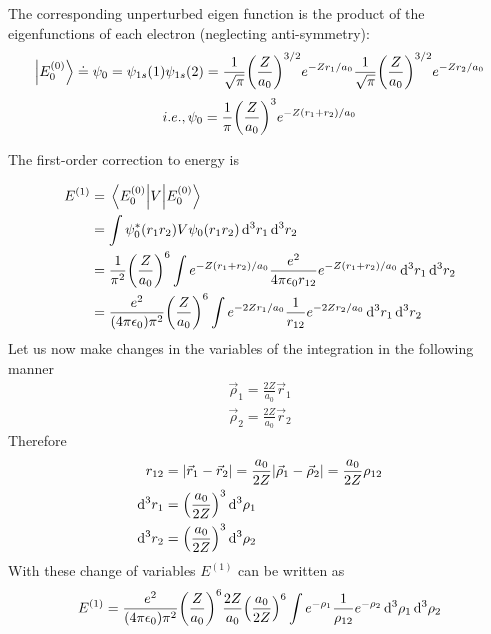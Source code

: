 \begin{enumerate}[label=Problem.\arabic*,start=1]
			
			The corresponding unperturbed eigen function is the product of the eigenfunctions of each electron (neglecting anti-symmetry):
			\begin{align*}
				\ket{E_0^{(0)}} \doteq \psi_0 = \psi_{1 s}(1) \psi_{1 s}(2) 
				= \frac{1}{\sqrt{\pi}} \qty(\frac{Z}{a_0})^{3/2} e^{- Z r_1 / a_0} 
				\frac{1}{\sqrt{\pi}} \qty(\frac{Z}{a_0})^{3/2} e^{- Z r_2 / a_0}
			\end{align*}
			\begin{align*}
			i.e., \psi_0 = \frac{1}{\pi} \qty(\frac{Z}{a_0})^{3} e^{-Z\qty(r_1 + r_2) / a_0}
			\end{align*}
			
			The first-order correction to energy is
			
			\begin{align*}
				E^{(1)} 
				&= \expval{V}{E_0^{(0)}} \\
				&= \int \psi_0^{*}\qty(r_1 r_2) V \psi_0\qty(r_1 r_2) \dd[3]{r_1} \dd[3]{r_2} \\
				&= \frac{1}{\pi^2} \qty(\frac{Z}{a_0})^6 \int e^{-Z (r_1 + r_2)/a_0} \frac{e^2}{4\pi \epsilon_0 r_{1 2}} e^{-Z (r_1 + r_2)/a_0} \dd[3]{r_1} \dd[3]{r_2}\\
				&= \frac{e^2}{\qty(4\pi \epsilon_0) \pi^2} \qty(\frac{Z}{a_0})^6 \int e^{- 2 Z r_1/a_0} \frac{1}{r_{1 2}} e^{- 2 Z r_2/a_0} \dd[3]{r_1} \dd[3]{r_2}
			\end{align*}
			Let us now make changes in the variables of the integration in the following manner
			\begin{align*}
				\vec{\rho}_1 = \frac{2 Z}{a_0} \vec{r}_1 \\
				\vec{\rho}_2 = \frac{2 Z}{a_0} \vec{r}_2
			\end{align*}
			Therefore
			\begin{align*}
				r_{1 2} &= \abs{\vec{r}_1 - \vec{r}_2} = \frac{a_0}{2 Z} \abs{\vec{\rho}_1 - \vec{\rho}_2} = \frac{a_0}{2 Z} \rho_{1 2}\\
				\dd[3]{r_1} &= \qty(\frac{a_0}{2 Z})^3 \dd[3]{\rho_1} \\
				\dd[3]{r_2} &= \qty(\frac{a_0}{2 Z})^3 \dd[3]{\rho_2}
			\end{align*}
			With these change of variables $E^{(1)}$ can be written as
			\begin{align*}
				E^{(1)} = \frac{e^2}{\qty(4 \pi \epsilon_0) \pi^2} \qty(\frac{Z}{a_0})^6 \frac{2 Z}{a_0} \qty(\frac{a_0}{2 Z})^6  \int e^{-\rho_1} \frac{1}{\rho_{1 2}} e^{-\rho_2} \dd[3]{\rho_1} \dd[3]{\rho_2}
			\end{align*}

\end{enumerate}
